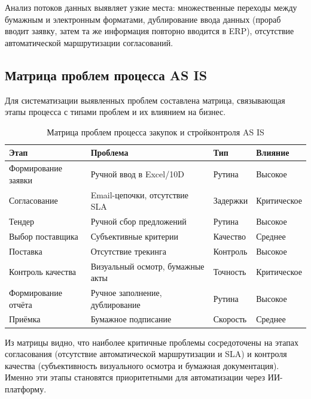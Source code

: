 \documentclass[12pt,a4paper]{article}
\begin{document}
Анализ потоков данных выявляет узкие места: множественные переходы между бумажным и электронным форматами, дублирование ввода данных (прораб вводит заявку, затем та же информация повторно вводится в ERP), отсутствие автоматической маршрутизации согласований.

\subsection{Матрица проблем процесса AS IS}

Для систематизации выявленных проблем составлена матрица, связывающая этапы процесса с типами проблем и их влиянием на бизнес.

\begin{table}[H]
\centering
\caption{Матрица проблем процесса закупок и стройконтроля AS IS}
\label{tab:problem_matrix}
\small
\begin{tabularx}{\textwidth}{|l|X|l|l|}
\hline
\rowcolor{samoletlight}
\textbf{Этап} & \textbf{Проблема} & \textbf{Тип} & \textbf{Влияние} \\
\hline
Формирование заявки & Ручной ввод в Excel/10D & Рутина & Высокое \\
\hline
Согласование & Email-цепочки, отсутствие SLA & Задержки & Критическое \\
\hline
Тендер & Ручной сбор предложений & Рутина & Высокое \\
\hline
Выбор поставщика & Субъективные критерии & Качество & Среднее \\
\hline
Поставка & Отсутствие трекинга & Контроль & Высокое \\
\hline
Контроль качества & Визуальный осмотр, бумажные акты & Точность & Критическое \\
\hline
Формирование отчёта & Ручное заполнение, дублирование & Рутина & Высокое \\
\hline
Приёмка & Бумажное подписание & Скорость & Среднее \\
\hline
\end{tabularx}
\end{table}

Из матрицы видно, что наиболее критичные проблемы сосредоточены на этапах согласования (отсутствие автоматической маршрутизации и SLA) и контроля качества (субъективность визуального осмотра и бумажная документация). Именно эти этапы становятся приоритетными для автоматизации через ИИ-платформу.

\newpage

\end{document}
